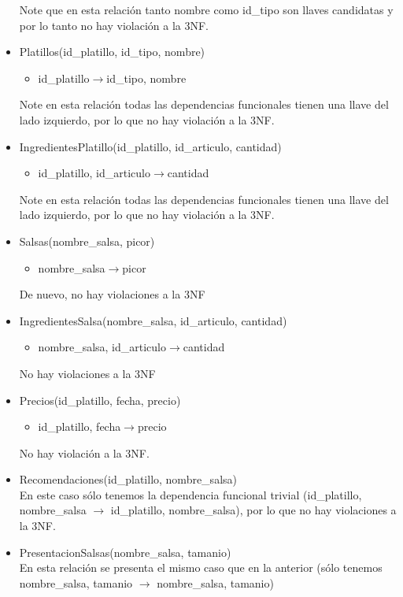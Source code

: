 \documentclass[11pt]{article}
\begin{document}
\begin{itemize}
\begin{itemize}
      \end{itemize}
      Note que en esta relación tanto nombre como id\_tipo son llaves candidatas y por lo tanto no hay violación a la 3NF. 
\item Platillos(id\_platillo, id\_tipo, nombre)
      \begin{itemize}
        \item id\_platillo$\rightarrow$id\_tipo, nombre
      \end{itemize}
      Note en esta relación todas las dependencias funcionales tienen una llave del lado izquierdo, por lo que no hay violación a la 3NF. 
\item IngredientesPlatillo(id\_platillo, id\_articulo, cantidad)
      \begin{itemize}
        \item id\_platillo, id\_articulo$\rightarrow$cantidad
      \end{itemize}
      Note en esta relación todas las dependencias funcionales tienen una llave del lado izquierdo, por lo que no hay violación a la 3NF. 
\item Salsas(nombre\_salsa, picor)
      \begin{itemize}
        \item nombre\_salsa$\rightarrow$picor
      \end{itemize}
      De nuevo, no hay violaciones a la 3NF
\item IngredientesSalsa(nombre\_salsa, id\_articulo, cantidad)
      \begin{itemize}
        \item nombre\_salsa, id\_articulo$\rightarrow$cantidad
      \end{itemize}
      No hay violaciones a la 3NF
\item Precios(id\_platillo, fecha, precio)
      \begin{itemize}
        \item id\_platillo, fecha$\rightarrow$precio
      \end{itemize}
      No hay violación a la 3NF. 
\item Recomendaciones(id\_platillo, nombre\_salsa)
      \\En este caso sólo tenemos la dependencia funcional trivial (id\_platillo, nombre\_salsa $\rightarrow$ id\_platillo, nombre\_salsa), por lo que no hay violaciones a la 3NF.
\item PresentacionSalsas(nombre\_salsa, tamanio)
      \\En esta relación se presenta el mismo caso que en la anterior (sólo tenemos nombre\_salsa, tamanio $\rightarrow$ nombre\_salsa, tamanio)

\end{itemize}
\end{document}
